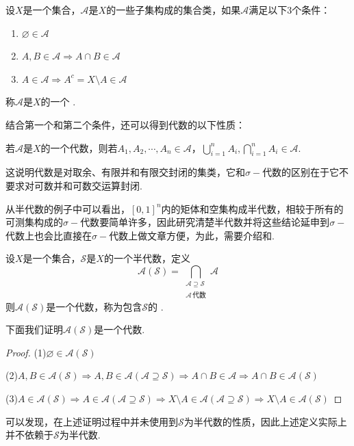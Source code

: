 \begin{definition}[代数]
    设$X$是一个集合，$\mathcal{A}$是$X$的一些子集构成的集合类，如果$\mathcal{A}$满足以下3个条件：
    \begin{enumerate}
        \item $\varnothing\in\mathcal{A}$
        \item $A,B\in\mathcal{A}\Rightarrow A\cap B\in\mathcal{A}$
        \item $A\in\mathcal{A}\Rightarrow A^c=X\setminus A\in\mathcal{A}$
    \end{enumerate}
    称$\mathcal{A}$是$X$的一个 .
\end{definition}
结合第一个和第二个条件，还可以得到代数的以下性质：
\begin{property}[代数]
    若$\mathcal{A}$是$X$的一个代数，则若$A_1,A_2,\cdots,A_n\in\mathcal{A}$，$\bigcup_{i=1}^n{A_i},\bigcap_{i=1}^n{A_i}\in\mathcal{A}$.
\end{property}
这说明代数是对取余、有限并和有限交封闭的集类，它和$\sigma-$代数的区别在于它不要求对可数并和可数交运算封闭.\par
从半代数的例子中可以看出，$[0,1]^n$内的矩体和空集构成半代数，相较于所有的可测集构成的$\sigma-\text{代数}$要简单许多，因此研究清楚半代数并将这些结论延申到$\sigma-$代数上也会比直接在$\sigma-$代数上做文章方便，为此，需要介绍和.\par
\begin{definition}[最小代数]
    设$X$是一个集合，$\mathcal{S}$是$X$的一个半代数，定义\[\mathcal{A}(\mathcal{S})=\bigcap_{\substack{\mathcal{A}\supseteq\mathcal{S}\\\mathcal{A}\,\text{代数}}}{\mathcal{A}}\]
    则$\mathcal{A}(\mathcal{S})$是一个代数，称为包含$\mathcal{S}$的 .
\end{definition}
下面我们证明$\mathcal{A}(\mathcal{S})$是一个代数.
\begin{proof}
    (1)$\varnothing\in\mathcal{A}(\mathcal{S})$\par
    (2)$A,B\in\mathcal{A}(\mathcal{S})\Rightarrow A,B\in\mathcal{A}(\mathcal{A}\supseteq\mathcal{S}) \Rightarrow A\cap B\in\mathcal{A}\Rightarrow A\cap B\in\mathcal{A}(\mathcal{S})$\par
    (3)$A\in\mathcal{A}(\mathcal{S})\Rightarrow A\in\mathcal{A}(\mathcal{A}\supseteq\mathcal{S}) \Rightarrow X\setminus A\in\mathcal{A}(\mathcal{A}\supseteq\mathcal{S})\Rightarrow X\setminus A\in\mathcal{A}(\mathcal{S})$
\end{proof}
\begin{remark}
    可以发现，在上述证明过程中并未使用到$\mathcal{S}$为半代数的性质，因此上述定义实际上并不依赖于$\mathcal{S}$为半代数.
\end{remark}
